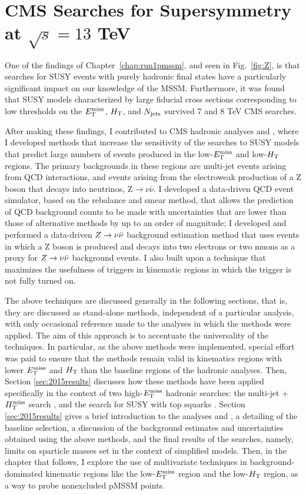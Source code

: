 \chapter{CMS Searches for Supersymmetry at $\sqrt{s}=13$ TeV}
\label{chap:susysearches}
One of the findings of Chapter~\ref{chap:run1pmssm}, and seen in Fig.~\ref{fig:Z}, is that searches for SUSY events with purely hadronic final states have a particularly significant impact on our knowledge of the MSSM. Furthermore, it was found that SUSY models characterized by large fiducial cross sections corresponding to low thresholds on the $E_{\text{T}}^{\rm miss}$, $H_{\rm T}$, and $N_{\rm jets}$ survived 7 and 8 TeV CMS searches. 

After making these findings, I contributed to CMS hadronic analyses \cite{Khachatryan:2016kdk} and \cite{CMS:2016nhb}, where I developed methods that increase the sensitivity of the searches to SUSY models that predict large numbers of events produced in the low-$E_{\text{T}}^{\rm miss}$ and low-$H_{\rm T}$ regions. The primary backgrounds in these regions are multi-jet events arising from QCD interactions, and events arising from the electroweak production of a Z boson that decays into neutrinos, Z$\rightarrow\nu\bar{\nu}$. I developed a data-driven QCD event simulator, based on the rebalance and smear method, that allows the prediction of QCD background counts to be made with uncertainties that are lower than those of alternative methods by up to an order of magnitude; I developed and performed a data-driven $Z\rightarrow \nu\bar{\nu}$ background estimation method that uses events in which a Z boson is produced and decays into two electrons or two muons as a proxy for $Z\rightarrow \nu\bar{\nu}$ background events. I also built upon a technique that maximizes the usefulness of triggers in kinematic regions in which the trigger is not fully turned on. 

The above techniques are discussed generally in the following sections, that is, they are discussed as stand-alone methods, independent of a particular analysis, with only occasional reference made to the analyses in which the methods were applied. The aim of this approach is to accentuate the universality of the techniques. In particular, as the above methods were implemented, special effort was paid to ensure that the methods remain valid in kinematics regions with lower $E_{\text{T}}^{\rm miss}$ and $H_{\rm T}$ than the baseline regions of the hadronic analyses. Then, Section \ref{sec:2015results} discusses how these methods have been applied specifically in the context of two high-$E_{\text{T}}^{\rm miss}$ hadronic searches: the multi-jet + $H_{\text{T}}^{\rm miss}$ search \cite{Khachatryan:2016kdk}, and the search for SUSY with top squarks \cite{CMS:2016nhb}. Section \ref{sec:2015results} gives a brief introduction to the analyses \cite{Khachatryan:2016kdk} and \cite{CMS:2016nhb}, a detailing of the baseline selection, a discussion of the background estimates and uncertainties obtained using the above methods, and the final results of the searches, namely, limits on sparticle masses set in the context of simplified models.  Then, in the chapter that follows, I explore the use of multivariate techniques in background-dominated kinematic regions like the low-$E_{\text{T}}^{\rm miss}$ region and the low-$H_{\rm T}$ region, as a way to probe nonexcluded pMSSM points. 


